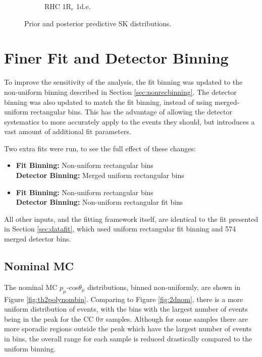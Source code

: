 \begin{figure}
\begin{subfigure}{.49\textwidth}
   \caption{RHC 1R$_{e}$ 1d.e.}
  \label{fig:skppnue1pi}
\end{subfigure}
\caption{Prior and posterior predictive SK distributions.}
\label{fig:skpp}
\end{figure}

\section{Finer Fit and Detector Binning}\label{sec:newbin}

To improve the sensitivity of the analysis, the fit binning was updated to the non-uniform binning described in Section \ref{sec:nonrecbinning}. The detector binning was also updated to match the fit binning, instead of using merged-uniform rectangular bins. This has the advantage of allowing the detector systematics to more accurately apply to the events they should, but introduces a vast amount of additional fit parameters.

Two extra fits were run, to see the full effect of these changes:

\begin{itemize}

\item \textbf{Fit Binning: } Non-uniform rectangular bins\\
\textbf{Detector Binning: } Merged uniform rectangular bins

\item \textbf{Fit Binning: } Non-uniform rectangular bins\\
\textbf{Detector Binning: } Non-uniform rectangular fit bins

\end{itemize}

All other inputs, and the fitting framework itself, are identical to the fit presented in Section \ref{sec:datafit}, which used uniform rectangular fit binning and 574 merged detector bins.

\subsection{Nominal MC}

The nominal MC $p_{\mu}$-cos$\theta_{\mu}$ distributions, binned non-uniformly, are shown in Figure \ref{fig:th2polynombin}. Comparing to Figure \ref{fig:2dnom}, there is a more uniform distribution of events, with the bins with the largest number of events being in the peak for the CC $0\pi$ samples. Although for some samples there are more sporadic regions outside the peak which have the largest number of events in bins, the overall range for each sample is reduced drastically compared to the uniform binning.

